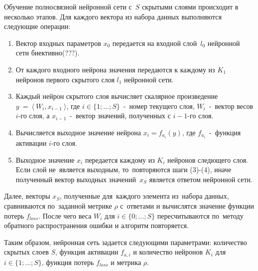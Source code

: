 Обучение полносвязной\cite[с.\,44]{bib:neural_networks} нейронной сети с~$S$ скрытыми слоями\cite[с.\,43]{bib:neural_networks} происходит в несколько этапов. Для каждого вектора из набора данных выполняются следующие операции:
\begin{enumerate}\label{alg:neural_education}
\item Вектор входных параметров $x_0$ передается на входной слой~$l_0$ нейронной сети биективно(???).
\item От каждого входного нейрона значения передаются к каждому из $K_1$ нейронов первого скрытого слоя $l_1$ нейронной сети.
\item Каждый нейрон скрытого слоя вычисляет скалярное произведение \newline $y~=~\langle~W_i, x_{i-1}~\rangle$, где $i\in\{1; \dots; S\}$~-~номер текущего слоя, $W_i$~-~вектор весов $i$-го слоя, а $x_{i-1}$~-~вектор значений, полученных с $i-1$-го слоя.
\item Вычисляется выходное значение нейрона $x_i = f_{a_i}(y)$, где $f_{a_i}$~-~функция активации\cite[с.\,151]{bib:neural_networks2} $i$-го слоя.
\item Выходное значение $x_i$ передается каждому из $K_i$ нейронов следющего слоя. Если слой не~является выходным, то~повторяются шаги (3)-(4), иначе полученный вектор выходных значений~$x_S$ является ответом нейронной сети.
\end{enumerate}
Далее, векторы $x_S$, полученные для~каждого элемента из~набора данных, сравниваются по~заданной метрике\cite{bib:metrics} $\rho$ с~ответами
и вычислятся значение функции потерь\cite[с.\,65]{bib:neural_networks2} $f_{loss}$. После чего веса $W_i$ для $i\in\{0; \dots; S\}$ пересчитываются по~методу обратного распространения ошибки\cite[с.\,151-184]{bib:neural_networks2} и алгоритм повторяется.

Таким образом, нейронная сеть задается следующими параметрами: количество скрытых слоев $S$, функция активации $f_{a,i}$ и количество нейронов $K_i$ для $i\in\{1; \dots; S\}$, функция потерь $f_{loss}$ и метрика $\rho$.

